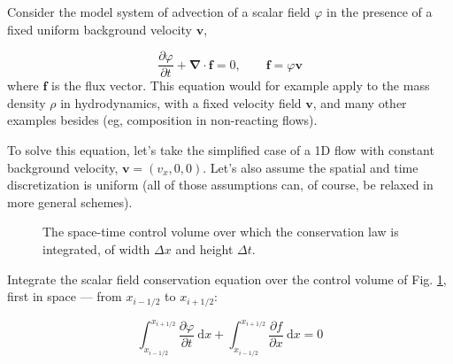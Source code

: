 \documentclass[notoc]{tufte-handout}
\renewcommand{\vec}[1]{\mathbf{#1}}
\newcommand{\del}{\vec{\nabla}}
\begin{document}
Consider the model system of advection of a scalar field $\varphi$ in the presence of a fixed uniform background velocity $\vec{v}$,

\begin{equation}
\frac{\partial \varphi}{\partial t} + \del\cdot\vec{f} = 0, \qquad \vec{f} = \varphi \vec{v}
\end{equation}
%
where $\vec{f}$ is the flux vector. This equation would for example apply to the mass density $\rho$ in hydrodynamics, with a fixed velocity field $\vec{v}$, and many other examples besides (eg, composition in non-reacting flows).

To solve this equation, let's take the simplified case of a 1D flow with constant background velocity, $\vec{v} = (v_x, 0, 0)$. Let's also assume the spatial and time discretization is uniform (all of those assumptions can, of course, be relaxed in more general schemes).

\begin{figure}[htbp]
\centering
{}
\caption{The space-time control volume over which the conservation law is integrated, of width $\Delta x$ and height $\Delta t$.}
\label{fig:controlvolume}
\end{figure}

Integrate the scalar field conservation equation over the control volume of Fig. \ref{fig:controlvolume}, first in space --- from $x_{i-1/2}$ to $x_{i+1/2}$:

\begin{equation}
\int_{x_{i-1/2}}^{x_{i+1/2}} \frac{\partial \varphi}{\partial t}~\mathrm{d}x + \int_{x_{i-1/2}}^{x_{i+1/2}} \frac{\partial f}{\partial x}~\mathrm{d}x = 0
\end{equation}
\end{document}
